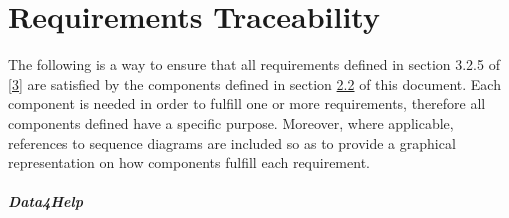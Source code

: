 
\chapter{Requirements Traceability}
The following is a way to ensure that all requirements defined in section 3.2.5 of \hyperref[ref:3]{[3]} are satisfied by the components defined in section \hyperref[sect:2.2]{2.2} of this document. Each component is needed in order to fulfill one or more requirements, therefore all components defined have a specific purpose. Moreover, where applicable, references to sequence diagrams are included so as to provide a graphical representation on how components fulfill each requirement.

\paragraph{Data4Help}
